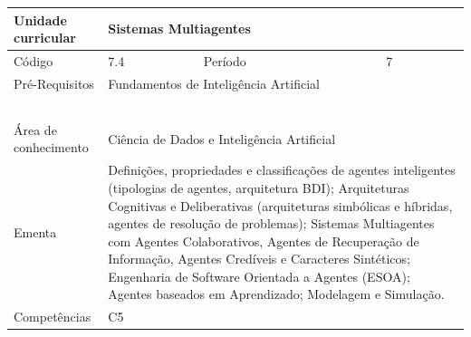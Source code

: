 \clearpage
\newpage

\begin{quadro}[ht!]
  \centering\scriptsize
\caption{Unidade Curricular Sistemas Multiagentes}

\begin{tabular}{|p{2.5cm}|p{2.5cm}|p{2.5cm}|p{2.5cm}|p{2.5cm}|}\hline

  Unidade curricular & \multicolumn{4}{p{10cm}|}{ Sistemas Multiagentes }\\\hline
  Código & 7.4 & Período & \multicolumn{2}{p{5cm}|}{ 7 }\\\hline
  Pré-Requisitos & \multicolumn{4}{p{10cm}|}{ Fundamentos de Inteligência Artificial } \\\hline
  \cellcolor{blue1}{ CH PRESENCIAL } &
    \cellcolor{blue1}{CH EAD Síncrona} &
    \cellcolor{blue1}{CH EAD Síncrona Mediada} &
    \cellcolor{blue1}{CH EAD Assíncrona} &
    \cellcolor{blue1}{CH APCC} \\\hline
  \cellcolor{blue1}{ 60 } &
    \cellcolor{blue1}{ 0 } &
    \cellcolor{blue1}{ 0 } &
    \cellcolor{blue1}{ 0 } &
    \cellcolor{blue1}{0} \\\hline
  \cellcolor{blue1}{ CH Teórica } &
    \cellcolor{blue1}{CH Prática} &
    \cellcolor{blue1}{CH Humanidades} &
    \cellcolor{blue1}{CH Extensão} &
    \cellcolor{blue1}{CH EAD TOTAL} \\\hline
  \cellcolor{blue1}{ 30 } &
    \cellcolor{blue1}{ 30 } &
    \cellcolor{blue1}{ 0 } &
    \cellcolor{blue1}{ 0 } &
    \cellcolor{blue1}{ 0 } \\\hline
  \cellcolor{blue1}{CARGA-HORÁRIA TOTAL} & \multicolumn{4}{p{10cm}|}{ \cellcolor{blue1}{ 60 } } \\\hline
  Área de conhecimento & \multicolumn{4}{p{10cm}|}{ Ciência de Dados e Inteligência Artificial } \\\hline
  Ementa & \multicolumn{4}{p{10cm}|}{ Definições, propriedades e classificações de agentes inteligentes (tipologias de agentes, arquitetura BDI); Arquiteturas Cognitivas e Deliberativas (arquiteturas simbólicas e híbridas, agentes de resolução de problemas); Sistemas Multiagentes com Agentes Colaborativos, Agentes de Recuperação de Informação, Agentes Credíveis e Caracteres Sintéticos; Engenharia de Software Orientada a Agentes (ESOA); Agentes baseados em Aprendizado; Modelagem e Simulação. } \\\hline
  Competências & \multicolumn{4}{p{10cm}|}{ C5 } \\\hline


  
	\end{tabular}

\end{quadro}


